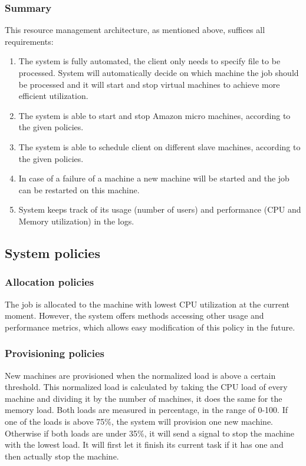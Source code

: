 \subsubsection{Summary}
This resource management architecture, as mentioned above, suffices all requirements:
\begin{enumerate}
 \item The system is fully automated, the client only needs to specify file to be processed. System will automatically decide on which machine the job should be processed and it will start and stop virtual machines to achieve more efficient utilization.
 \item The system is able to start and stop Amazon micro machines, according to the given policies.
 \item The system is able to schedule client on different slave machines, according to the given policies.
 \item In case of a failure of a machine a new machine will be started and the job can be restarted on this machine.
 \item System keeps track of its usage (number of users) and performance (CPU and Memory utilization) in the logs.
\end{enumerate}

\subsection{System policies}
\subsubsection{Allocation policies}
The job is allocated to the machine with lowest CPU utilization at the current moment. However, the system offers methods accessing other usage and performance metrics, which allows easy modification of this policy in the future.
\subsubsection{Provisioning policies}
New machines are provisioned when the normalized load is above a certain threshold. This normalized load is calculated by taking the CPU load of every machine and dividing it by the number of machines, it does the same for the memory load. Both loads are measured in percentage, in the range of 0-100. If one of the loads is above 75\%, the system will provision one new machine. Otherwise if both loads are under 35\%, it will send a signal to stop the machine with the lowest load. It will first let it finish its current task if it has one and then actually stop the machine.

